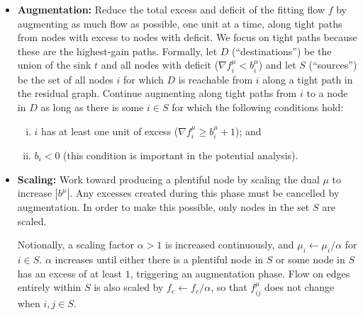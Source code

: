 \documentclass[11pt]{article}
\makeatletter
\let\comment\todo
\newcommand{\david}[1]{\comment[nolist,color=orange!40]{@david\\ #1}}
\theoremstyle{definition}
\theoremstyle{definition}
\theoremstyle{definition}
\renewcommand{\todo}[1]{\hl{TODO: #1}}
\makeatother
\begin{document}
    \begin{itemize}
    \item \textbf{Augmentation:} Reduce the total excess and deficit of the fitting flow $f$
    by augmenting as much flow as possible, one unit at a time, along tight paths from nodes with
		excess to nodes with deficit. We focus
		on tight paths because these are the highest-gain paths. Formally, let
    $D$ (``destinations'') be the union of the sink $t$ and all nodes with 
		deficit ($\nabla f_i^{\mu} < b_i^{\mu}$) and let $S$ (``sources'') be the
		set of all nodes $i$ for which $D$ is reachable from $i$ along a tight path
		in the residual graph. Continue augmenting along tight paths from $i$ to
		a node in $D$ as long as there is some $i \in S$ for which the following conditions hold:
    \begin{enumerate}[(i)]
    \item $i$ has at least one unit of excess ($\nabla f_i^{\mu} \ge b_i^{\mu} + 1$); and
    \item $b_i < 0$ (this condition is important in the potential analysis).
    \end{enumerate}

    \item \textbf{Scaling:} Work toward producing a plentiful node by scaling the
    dual $\mu$ to increase $|b^\mu|$. Any excesses created during this
    phase must be cancelled by augmentation. In order to make this possible,
		only nodes in the set $S$ are scaled. 
    
    Notionally, a scaling factor $\alpha > 1$ is increased continuously, and
    $\mu_i \gets \mu_i / \alpha$ for $i \in S$.
    $\alpha$ increases until either there is a plentiful node in $S$ or some
    node in $S$ has an excess of at least $1$, triggering an augmentation phase.
    Flow on edges entirely within $S$ is also scaled by $f_e \gets f_e/\alpha$,
    so that $f_{ij}^\mu$ does not change when $i, j \in S$.
    
    \end{itemize}
    
\end{document}
